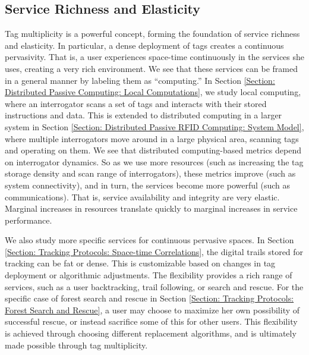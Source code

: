 \subsection{Service Richness and Elasticity}
Tag multiplicity is a powerful concept, forming the foundation of service richness and elasticity. In particular, a dense deployment of tags creates a continuous pervasivity. That is, a user experiences space-time continuously in the services she uses, creating a very rich environment. We see that these services can be framed in a general manner by labeling them as ``computing.'' In Section \ref{Section: Distributed Passive Computing: Local Computations}, we study local computing, where an interrogator scans a set of tags and interacts with their stored instructions and data. This is extended to distributed computing in a larger system in Section \ref{Section: Distributed Passive RFID Computing: System Model}, where multiple interrogators move around in a large physical area, scanning tags and operating on them. We see that distributed computing-based metrics depend on interrogator dynamics. So as we use more resources (such as increasing the tag storage density and scan range of interrogators), these metrics improve (such as system connectivity), and in turn, the services become more powerful (such as communications). That is, service availability and integrity are very elastic. Marginal increases in resources translate quickly to marginal increases in service performance. 

We also study more specific services for continuous pervasive spaces. In Section \ref{Section: Tracking Protocols: Space-time Correlations}, the digital trails stored for tracking can be fat or dense. This is customizable based on changes in tag deployment or algorithmic adjustments. The flexibility provides a rich range of services, such as a user backtracking, trail following, or search and rescue. For the specific case of forest search and rescue in Section \ref{Section: Tracking Protocols: Forest Search and Rescue}, a user may choose to maximize her own possibility of successful rescue, or instead sacrifice some of this for other users. This flexibility is achieved through choosing different replacement algorithms, and is ultimately made possible through tag multiplicity.

